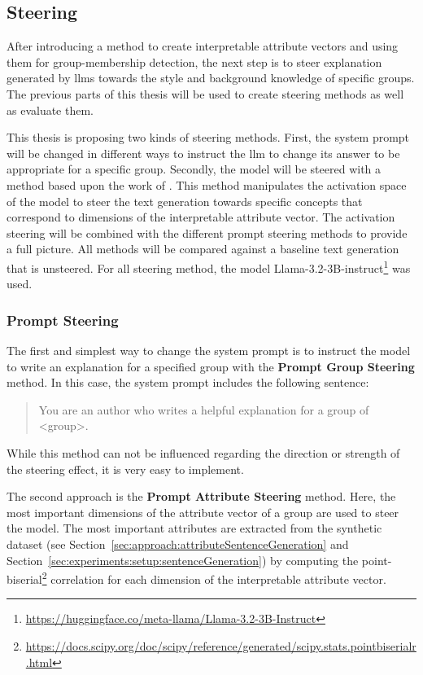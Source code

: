 \subsection{Steering}
\label{sec:experiments:setup:steering}
After introducing a method to create interpretable attribute vectors and using them for group-membership detection, the next step is to steer explanation generated by \aclp{llm} towards the style and background knowledge of specific groups. The previous parts of this thesis will be used to create steering methods as well as evaluate them.

This thesis is proposing two kinds of steering methods. First, the system prompt will be changed in different ways to instruct the \ac{llm} to change its answer to be appropriate for a specific group. Secondly, the model will be steered with a method based upon the work of \citet{konenStyleVectorsSteering2024,turnerActivationAdditionSteering2024,rimsky-etal-2024-steering}. This method manipulates the activation space of the model to steer the text generation towards specific concepts that correspond to dimensions of the interpretable attribute vector. The activation steering will be combined with the different prompt steering methods to provide a full picture. %
All methods will be compared against a baseline text generation that is unsteered.
For all steering method, the model Llama-3.2-3B-instruct\footnote{\url{https://huggingface.co/meta-llama/Llama-3.2-3B-Instruct}} was used.

\subsubsection{Prompt Steering}
\label{sec:experiments:setup:steering:prompt}
The first and simplest way to change the system prompt is to instruct the model to write an explanation for a specified group with the \textbf{Prompt Group Steering} method. In this case, the system prompt includes the following sentence:
\begin{quote} %
  You are an author who writes a helpful explanation for a group of <group>.
\end{quote}
While this method can not be influenced regarding the direction or strength of the steering effect, it is very easy to implement.%

The second approach is the \textbf{Prompt Attribute Steering} method. Here, the most important dimensions of the attribute vector of a group are used to steer the model. The most important attributes are extracted from the synthetic dataset (see Section~\ref{sec:approach:attributeSentenceGeneration} and Section~\ref{sec:experiments:setup:sentenceGeneration}) by computing the point-biserial\footnote{\url{https://docs.scipy.org/doc/scipy/reference/generated/scipy.stats.pointbiserialr.html}} correlation for each dimension of the interpretable attribute vector.

